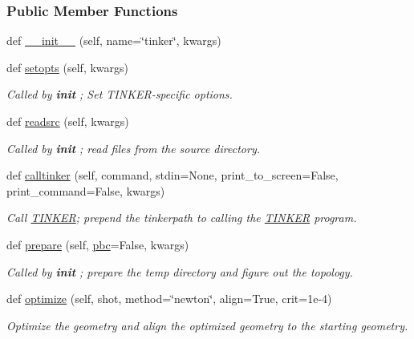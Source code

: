 \subsubsection*{Public Member Functions}
\begin{DoxyCompactItemize}
\item 
def \hyperlink{classsrc_1_1tinkerio_1_1TINKER_afe031bd299b6941e37eb30cd1f267f0b}{\+\_\+\+\_\+init\+\_\+\+\_\+} (self, name=\char`\"{}tinker\char`\"{}, kwargs)
\item 
def \hyperlink{classsrc_1_1tinkerio_1_1TINKER_a896aacb11fbb0f3eb03268d5ad08cbae}{setopts} (self, kwargs)
\begin{DoxyCompactList}\small\item\em Called by {\bfseries init} ; Set T\+I\+N\+K\+E\+R-\/specific options. \end{DoxyCompactList}\item 
def \hyperlink{classsrc_1_1tinkerio_1_1TINKER_afb70e7572374ef07483aacd2d14195b1}{readsrc} (self, kwargs)
\begin{DoxyCompactList}\small\item\em Called by {\bfseries init} ; read files from the source directory. \end{DoxyCompactList}\item 
def \hyperlink{classsrc_1_1tinkerio_1_1TINKER_ace7003bc50f5ccdc1b2b065fb886b457}{calltinker} (self, command, stdin=None, print\+\_\+to\+\_\+screen=False, print\+\_\+command=False, kwargs)
\begin{DoxyCompactList}\small\item\em Call \hyperlink{classsrc_1_1tinkerio_1_1TINKER}{T\+I\+N\+K\+ER}; prepend the tinkerpath to calling the \hyperlink{classsrc_1_1tinkerio_1_1TINKER}{T\+I\+N\+K\+ER} program. \end{DoxyCompactList}\item 
def \hyperlink{classsrc_1_1tinkerio_1_1TINKER_ae792345131bcdde1062bec5ab20ff7ea}{prepare} (self, \hyperlink{classsrc_1_1tinkerio_1_1TINKER_ac4f3fc8871832348c61e63d9ef5862a2}{pbc}=False, kwargs)
\begin{DoxyCompactList}\small\item\em Called by {\bfseries init} ; prepare the temp directory and figure out the topology. \end{DoxyCompactList}\item 
def \hyperlink{classsrc_1_1tinkerio_1_1TINKER_a925601bd948f7a34dd0a229da9b16f0a}{optimize} (self, shot, method=\char`\"{}newton\char`\"{}, align=True, crit=1e-\/4)
\begin{DoxyCompactList}\small\item\em Optimize the geometry and align the optimized geometry to the starting geometry. \end{DoxyCompactList}\item 

\end{DoxyCompactItemize}
